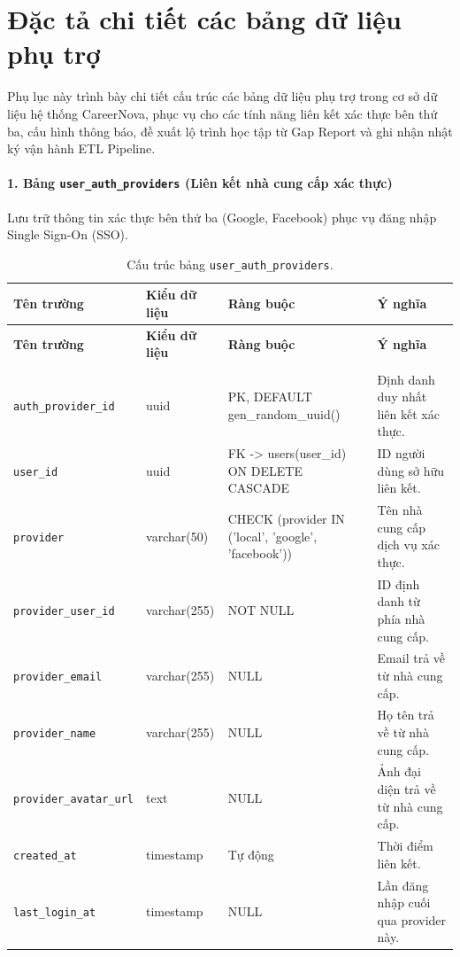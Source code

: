 \chapter{Đặc tả chi tiết các bảng dữ liệu phụ trợ}
\label{Appendix:db_spec}

Phụ lục này trình bày chi tiết cấu trúc các bảng dữ liệu phụ trợ trong cơ sở dữ liệu hệ thống CareerNova, phục vụ cho các tính năng liên kết xác thực bên thứ ba, cấu hình thông báo, đề xuất lộ trình học tập từ Gap Report và ghi nhận nhật ký vận hành ETL Pipeline.

\subsubsection*{1. Bảng \texttt{user\_\allowbreak auth\_\allowbreak providers} (Liên kết nhà cung cấp xác thực)}

Lưu trữ thông tin xác thực bên thứ ba (Google, Facebook) phục vụ đăng nhập Single Sign-On (SSO).

\begin{footnotesize}\begin{longtable}{|L{3.5cm}|L{2.0cm}|L{3.0cm}|L{5.5cm}|}
\caption{Cấu trúc bảng \texttt{user\_\allowbreak auth\_\allowbreak providers}.}
\label{tab:auth_providers} \\
\hline
\textbf{Tên trường} & \textbf{Kiểu dữ liệu} & \textbf{Ràng buộc} & \textbf{Ý nghĩa} \\
\hline
\endfirsthead
\hline
\textbf{Tên trường} & \textbf{Kiểu dữ liệu} & \textbf{Ràng buộc} & \textbf{Ý nghĩa} \\
\hline
\text{ } \\ %
\hline
\endhead
\texttt{auth\_\allowbreak provider\_\allowbreak id} & uuid & PK, DEFAULT gen\_random\_uuid() & Định danh duy nhất liên kết xác thực. \\
\hline
\texttt{user\_id} & uuid & FK -> users(user\_id) ON DELETE CASCADE & ID người dùng sở hữu liên kết. \\
\hline
\texttt{provider} & varchar(50) & CHECK (provider IN ('local', 'google', 'facebook')) & Tên nhà cung cấp dịch vụ xác thực. \\
\hline
\texttt{provider\_\allowbreak user\_\allowbreak id} & varchar(255) & NOT NULL & ID định danh từ phía nhà cung cấp. \\
\hline
\texttt{provider\_\allowbreak email} & varchar(255) & NULL & Email trả về từ nhà cung cấp. \\
\hline
\texttt{provider\_\allowbreak name} & varchar(255) & NULL & Họ tên trả về từ nhà cung cấp. \\
\hline
\texttt{provider\_\allowbreak avatar\_\allowbreak url} & text & NULL & Ảnh đại diện trả về từ nhà cung cấp. \\
\hline
\texttt{created\_at} & timestamp & Tự động & Thời điểm liên kết. \\
\hline
\texttt{last\_\allowbreak login\_\allowbreak at} & timestamp & NULL & Lần đăng nhập cuối qua provider này. \\
\hline
\end{longtable}
\end{footnotesize}

